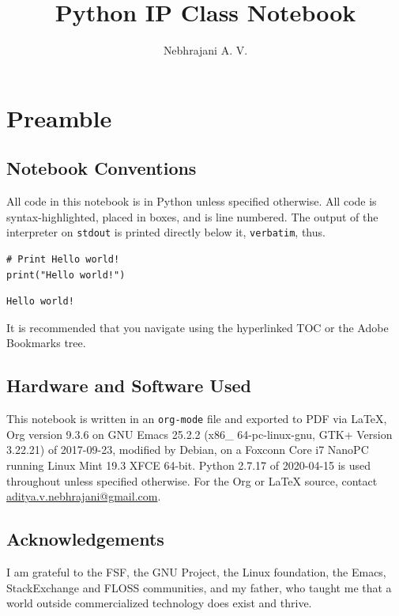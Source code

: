 \documentclass[11pt]{article}
\author{Nebhrajani A. V.}
\date{}
\title{Python IP Class Notebook}
\begin{document}
\maketitle
\tableofcontents

\newpage

\section{Preamble}
\label{sec:orgdff450f}
\subsection{Notebook Conventions}
\label{sec:orgf7aadbf}
All code in this notebook is in Python unless specified otherwise.
All code is syntax-highlighted, placed in boxes, and is line
numbered. The output of the interpreter on \texttt{stdout} is printed directly below it,
\texttt{verbatim}, thus.
\begin{verbatim}
# Print Hello world!
print("Hello world!")
\end{verbatim}

\begin{verbatim}
Hello world!
\end{verbatim}


It is recommended that you navigate using the hyperlinked TOC or the Adobe
Bookmarks tree.

\subsection{Hardware and Software Used}
\label{sec:orgcb505a7}

 This notebook is written in an \texttt{org-mode} file and exported to PDF via \LaTeX{}, Org version 9.3.6 on
GNU Emacs 25.2.2 (x86\_ 64-pc-linux-gnu, GTK+ Version 3.22.21) of
2017-09-23, modified by Debian, on a Foxconn Core i7 NanoPC running Linux
Mint 19.3 XFCE 64-bit. Python 2.7.17 of 2020-04-15 is used
throughout unless specified otherwise. For the Org or \LaTeX{} source, contact
\href{mailto:aditya.v.nebhrajani@gmail.com}{aditya.v.nebhrajani@gmail.com}.

\subsection{Acknowledgements}
\label{sec:org7351f44}
I am grateful to the FSF, the GNU Project, the Linux foundation,
the Emacs, StackExchange and FLOSS communities, and my father,
who taught me that a world outside commercialized technology does
exist and thrive.
\newpage
\end{document}
